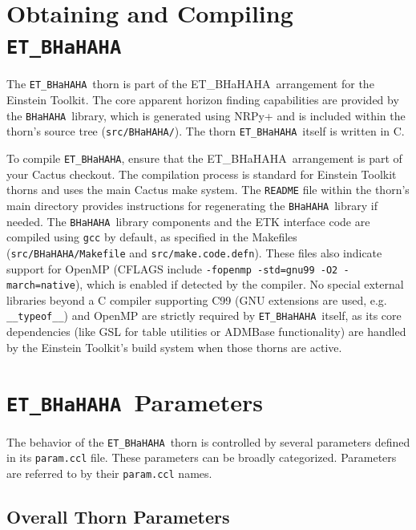 \documentclass[a4paper,11pt]{article}
\newcommand{\thorn}[1]{{\tt #1}}
\newcommand{\arrangement}[1]{{\sc #1}}
\newcommand{\file}[1]{{\tt #1}}
\newcommand{\ETBHaHAHA}{\arrangement{ET\_BHaHAHA}}
\newcommand{\BHaHAHA}{\thorn{ET\_BHaHAHA}} %
\newcommand{\bhahlib}{\texttt{BHaHAHA}} %
\begin{document}
\section{Obtaining and Compiling \BHaHAHA}
\label{sec:obtaining}

The \BHaHAHA\ thorn is part of the \ETBHaHAHA\ arrangement for the Einstein Toolkit. The core apparent horizon finding capabilities are provided by the \bhahlib\ library, which is generated using NRPy+ \cite{NRPyWWW, NRPyGit} and is included within the thorn's source tree (\file{src/BHaHAHA/}).
The thorn \BHaHAHA\ itself is written in C.

To compile \BHaHAHA, ensure that the \ETBHaHAHA\ arrangement is part of your Cactus checkout. The compilation process is standard for Einstein Toolkit thorns and uses the main Cactus make system.
The \file{README} file within the thorn's main directory provides instructions for regenerating the \bhahlib\ library if needed.
The \bhahlib\ library components and the ETK interface code are compiled using \texttt{gcc} by default, as specified in the Makefiles (\file{src/BHaHAHA/Makefile} and \file{src/make.code.defn}). These files also indicate support for OpenMP (CFLAGS include \texttt{-fopenmp -std=gnu99 -O2 -march=native}), which is enabled if detected by the compiler.
No special external libraries beyond a C compiler supporting C99 (GNU extensions are used, e.g. \texttt{\_\_typeof\_\_}) and OpenMP are strictly required by \BHaHAHA\ itself, as its core dependencies (like GSL for table utilities or ADMBase functionality) are handled by the Einstein Toolkit's build system when those thorns are active.

\section{\BHaHAHA\ Parameters}
\label{sec:params}
The behavior of the \BHaHAHA\ thorn is controlled by several parameters defined in its \file{param.ccl} file. These parameters can be broadly categorized. Parameters are referred to by their \texttt{param.ccl} names.

\subsection{Overall Thorn Parameters}
\label{ssec:params_overall}
\end{document}
